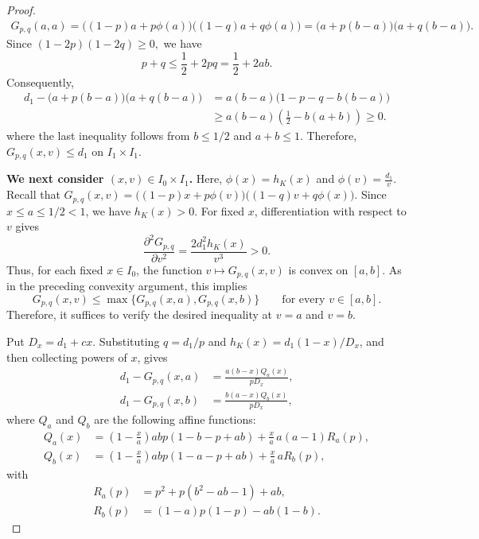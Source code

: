 \documentclass[10pt,a4paper]{amsart}
\begin{document}
\begin{proof}
\begin{align*}
 G_{p,q}(a,a)
 =
 \bigl((1-p)a+p\phi(a)\bigr)
 \bigl((1-q)a+q\phi(a)\bigr)=
 \bigl(a+p(b-a)\bigr)
 \bigl(a+q(b-a)\bigr).
\end{align*}
Since
$
 (1-2p)(1-2q)\geq0,
$
we have
\begin{equation*}
 p+q\leq\frac12+2pq=\frac12+2ab.
\end{equation*}
Consequently,
\begin{align*}
 d_1-
 \bigl(a+p(b-a)\bigr)
 \bigl(a+q(b-a)\bigr)&=
 a(b-a)\bigl(1-p-q-b(b-a)\bigr)\\
 &\geq
 a(b-a)\left(\frac12-b(a+b)\right)\geq0.
\end{align*}
where the last inequality follows from $b\leq1/2$ and $a+b\leq1$.
Therefore, $G_{p,q}(x,v)\leq d_1$ on $I_1\times I_1$.

\textbf{We next consider $(x,v)\in I_0\times I_1$.} Here,
$
 \phi(x)=h_K(x)
$
and
$
 \phi(v)=\frac{d_1}{v}.
$
Recall that $G_{p,q}(x,v)
 =
 \bigl((1-p)x+p\phi(v)\bigr)
 \bigl((1-q)v+q\phi(x)\bigr).$
Since $x\leq a\leq1/2<1$, we have $h_K(x)>0$.
For fixed $x$, differentiation with respect to $v$ gives
\begin{equation*}
 \frac{\partial^2G_{p,q}}{\partial v^2}
 =
 \frac{2d_1^2h_K(x)}{v^3}>0.
\end{equation*}
Thus, for each fixed $x\in I_0$, the function
$v\mapsto G_{p,q}(x,v)$ is convex on $[a,b]$. As in the preceding
convexity argument, this implies
\begin{equation*}
 G_{p,q}(x,v)
 \leq
 \max\bigl\{G_{p,q}(x,a),G_{p,q}(x,b)\bigr\}
 \qquad\text{for every }v\in[a,b].
\end{equation*}
Therefore, it suffices to verify the desired inequality at
$v=a$ and $v=b$.

Put
$
 D_x=d_1+cx.
$
Substituting $q=d_1/p$ and
$h_K(x)=d_1(1-x)/D_x$, and then collecting powers of $x$, gives
\begin{align}
 d_1-G_{p,q}(x,a)
 &=
 \frac{a(b-x)Q_a(x)}{pD_x},
 \label{eq:Qa-factor}\\
 d_1-G_{p,q}(x,b)
 &=
 \frac{b(a-x)Q_b(x)}{pD_x},
 \label{eq:Qb-factor}
\end{align}
where $Q_a$ and $Q_b$ are the following affine functions:
\begin{align*}
 Q_a(x)
 &=
 \left(1-\frac{x}{a}\right)
 abp(1-b-p+ab)
 +
 \frac{x}{a}\,a(a-1)R_a(p),\\
 Q_b(x)
 &=
 \left(1-\frac{x}{a}\right)
 abp(1-a-p+ab)
 +
 \frac{x}{a}\,aR_b(p),
\end{align*}
with
\begin{align*}
 R_a(p)
 &=
 p^2+p(b^2-ab-1)+ab,\\
 R_b(p)
 &=
 (1-a)p(1-p)-ab(1-b).
\end{align*}


\end{proof}
\end{document}
